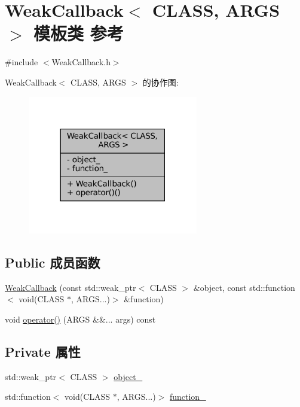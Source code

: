 \hypertarget{classmuduo_1_1WeakCallback}{}\section{Weak\+Callback$<$ C\+L\+A\+SS, A\+R\+GS $>$ 模板类 参考}
\label{classmuduo_1_1WeakCallback}


{\ttfamily \#include $<$Weak\+Callback.\+h$>$}



Weak\+Callback$<$ C\+L\+A\+SS, A\+R\+GS $>$ 的协作图\+:
\nopagebreak
\begin{figure}[H]
\begin{center}
\leavevmode
\includegraphics[width=211pt]{classmuduo_1_1WeakCallback__coll__graph}
\end{center}
\end{figure}
\subsection*{Public 成员函数}
\begin{DoxyCompactItemize}
\item 
\hyperlink{classmuduo_1_1WeakCallback_aa8d539f1d3b426a86729585dfdae788d}{Weak\+Callback} (const std\+::weak\+\_\+ptr$<$ C\+L\+A\+SS $>$ \&object, const std\+::function$<$ void(C\+L\+A\+SS $\ast$, A\+R\+G\+S...)$>$ \&function)
\item 
void \hyperlink{classmuduo_1_1WeakCallback_a921a43a7ebf225a0e20ac206789d6cd5}{operator()} (A\+R\+GS \&\&... args) const
\end{DoxyCompactItemize}
\subsection*{Private 属性}
\begin{DoxyCompactItemize}
\item 
std\+::weak\+\_\+ptr$<$ C\+L\+A\+SS $>$ \hyperlink{classmuduo_1_1WeakCallback_a0b18c89cc214310eb53187794fd9c4ad}{object\+\_\+}
\item 
std\+::function$<$ void(C\+L\+A\+SS $\ast$, A\+R\+G\+S...)$>$ \hyperlink{classmuduo_1_1WeakCallback_ab07abe69e9a619ff06455edebb7aee64}{function\+\_\+}
\end{DoxyCompactItemize}



